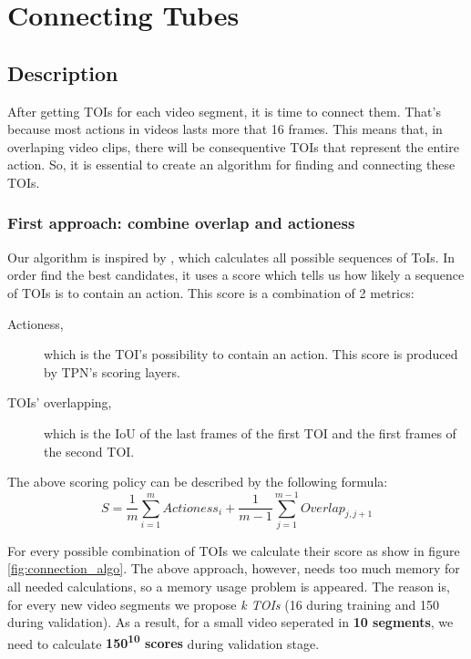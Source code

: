 \documentclass{report}
\begin{document}
\chapter{Connecting Tubes}
\section{Description}
After getting TOIs for each video segment, it is time to connect them. That's because most actions in videos lasts more that 16 frames.
This means that, in overlaping video clips, there will be consequentive TOIs that represent the entire action. So, it is essential to create
an algorithm for finding and connecting these TOIs.
\subsection{First approach: combine overlap and actioness}
Our algorithm is inspired by \cite{DBLP:journals/corr/HouCS17}, which calculates all possible sequences of ToIs. In order find the best candidates, it uses a score which tells us how likely a sequence of TOIs is  to contain an action. This score is a combination of 2 metrics:
\begin{description}
\item[ Actioness,  ] which is the TOI's possibility to contain an action. This score is produced by TPN's scoring layers.
\item [ TOIs' overlapping, ] which is the IoU of the last frames of the first TOI and the first frames of the second TOI.
\end{description}

The above scoring policy can be described by the following formula:
\[ S = \frac{1}{m} \sum_ {i=1}^{m} Actioness_i + \frac{1}{m-1} \sum_{j=1}^{m-1} Overlap_{j,j+1} \]

For every possible combination of TOIs we calculate their score as show in figure \ref{fig:connection_algo}.
The above approach, however, needs too much memory for all needed calculations, so a memory usage  problem is
appeared. The reason is, for every new video segments we propose \textit{k TOIs} (16 during training and 150 during validation).
As a result, for a small video seperated in  \textbf{10 segments}, we need to calculate 
\textbf{  150\textsuperscript{10} scores} during validation stage. \par
\end{document}

